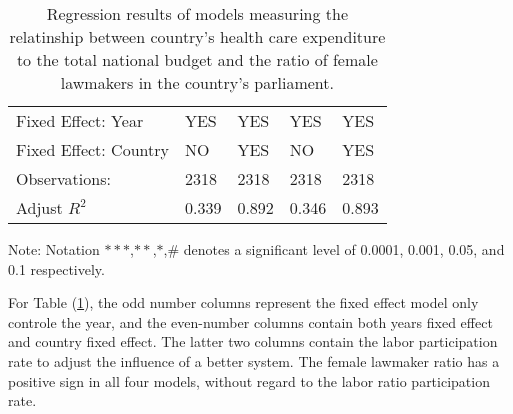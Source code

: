 {\begin{table}[H]
\begin{tabular}{l|llll}
Fixed Effect: Year                            & YES                                                               & YES                                                                & YES                                                               & YES                                                                \\
Fixed Effect: Country                         & NO                                                                & YES                                                                & NO                                                                & YES                                                                \\
Observations:                              & 2318                                                               & 2318                                                                & 2318                                                               & 2318                                                                \\
Adjust $R^2$                                  & 0.339                                                             & 0.892                                                              & 0.346                                                             & 0.893                                                              \\ \hline
\end{tabular}
\begin{tablenotes}
\small
      \item Note: Notation $***$,$**$,$*$,$\#$ denotes a significant level of 0.0001, 0.001, 0.05, and 0.1 respectively.
    \end{tablenotes}

\caption{Regression results of models measuring the relatinship between country's health care expenditure to the total national budget and the ratio of female lawmakers in the country's parliament. }
\label{Baseline}

\end{table}
}

For Table (\ref{Baseline}), the odd number columns represent the fixed effect model only controle the year, and the even-number columns contain both years fixed effect and country fixed effect.
The latter two columns contain the labor participation rate to adjust the influence of a better system.
The female lawmaker ratio has a positive sign in all four models, without regard to the labor ratio participation rate.

